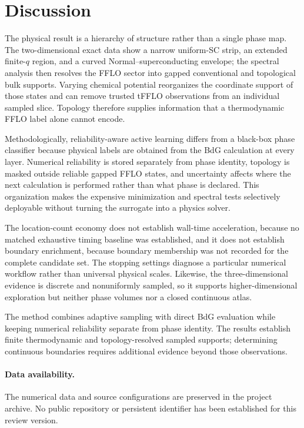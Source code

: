 \section{Discussion}
The physical result is a hierarchy of structure rather than a single phase map.  The two-dimensional exact data show a narrow uniform-SC strip, an extended finite-$q$ region, and a curved Normal--superconducting envelope; the spectral analysis then resolves the FFLO sector into gapped conventional and topological bulk supports.  Varying chemical potential reorganizes the coordinate support of those states and can remove trusted tFFLO observations from an individual sampled slice.  Topology therefore supplies information that a thermodynamic FFLO label alone cannot encode.

Methodologically, reliability-aware active learning differs from a black-box phase classifier because physical labels are obtained from the BdG calculation at every layer.  Numerical reliability is stored separately from phase identity, topology is masked outside reliable gapped FFLO states, and uncertainty affects where the next calculation is performed rather than what phase is declared.  This organization makes the expensive minimization and spectral tests selectively deployable without turning the surrogate into a physics solver.

The location-count economy does not establish wall-time acceleration, because no matched exhaustive timing baseline was established, and it does not establish boundary enrichment, because boundary membership was not recorded for the complete candidate set.  The stopping settings diagnose a particular numerical workflow rather than universal physical scales.  Likewise, the three-dimensional evidence is discrete and nonuniformly sampled, so it supports higher-dimensional exploration but neither phase volumes nor a closed continuous atlas.

The method combines adaptive sampling with direct BdG evaluation while keeping numerical reliability separate from phase identity. The results establish finite thermodynamic and topology-resolved sampled supports; determining continuous boundaries requires additional evidence beyond those observations.

\paragraph{Data availability.} The numerical data and source configurations are preserved in the project archive. No public repository or persistent identifier has been established for this review version.
